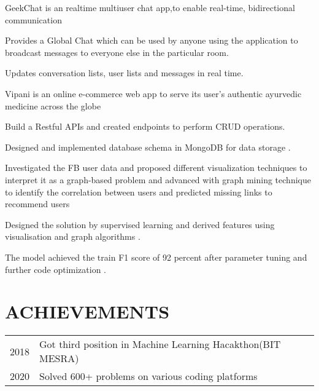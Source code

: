 \documentclass[]{deedy-resume-openfont}
\begin{document}
\begin{minipage}[t]{0.66\textwidth}
GeekChat is an realtime multiuser chat app,to enable real-time, bidirectional communication
\begin{tightemize}
\item Provides a Global Chat which can be used by anyone using the application to
broadcast messages to everyone else in the particular room.
\item Updates conversation lists, user lists and messages in real time.
\end{tightemize}
\sectionsep

Vipani is an online e-commerce web app to serve its user’s authentic ayurvedic
medicine across the globe
\begin{tightemize}
\item Build a Restful APIs and created endpoints to perform CRUD operations.
\item Designed and implemented database schema in MongoDB for data storage .
\end{tightemize}
\sectionsep



Investigated the FB user data and proposed different visualization techniques to
interpret it as a graph-based problem and advanced with graph mining technique to
identify the correlation between users and predicted missing links to recommend
users
\begin{tightemize}
\item Designed the solution by supervised learning and derived features using
visualisation and graph algorithms .
\item The model achieved the train F1 score of 92 percent after parameter tuning
and further code optimization .
\end{tightemize}
\sectionsep



\section{ACHIEVEMENTS} 
\begin{tabular}{rll}
2018	    & Got third position in Machine Learning Hacakthon(BIT MESRA)\\
2020        &Solved 600+ problems on various coding platforms
\end{tabular}
\sectionsep



\end{minipage} 
\end{document}
